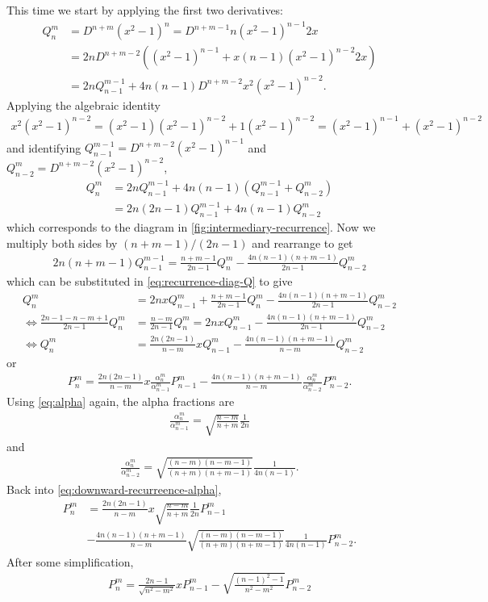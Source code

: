 \documentclass[12pt]{article}
\begin{document}
This time we start by applying the first two derivatives:
\begin{align}
  Q_n^m &= D^{n+m}(x^2-1)^n = D^{n+m-1}n(x^2-1)^{n-1}2x \\ 
        &= 2nD^{n+m-2}\left((x^2-1)^{n-1}+x(n-1)(x^2-1)^{n-2}2x\right)\\ 
        &= 2nQ_{n-1}^{m-1} + 4n(n-1)D^{n+m-2}x^2(x^2-1)^{n-2}.
\end{align}
Applying the algebraic identity 
\begin{align}
  x^2(x^2-1)^{n-2} = (x^2-1)(x^2-1)^{n-2} + 1(x^2-1)^{n-2} = (x^2-1)^{n-1} + (x^2-1)^{n-2}
\end{align}
and identifying $Q_{n-1}^{m-1}=D^{n+m-2}(x^2-1)^{n-1}$ and $Q_{n-2}^{m}=D^{n+m-2}(x^2-1)^{n-2}$,
\begin{align}
  Q_n^m &= 2nQ_{n-1}^{m-1} + 4n(n-1)\left(Q_{n-1}^{m-1} + Q_{n-2}^m\right)\\ 
        &= 2n(2n - 1)Q_{n-1}^{m-1} + 4n(n-1)Q_{n-2}^m
\end{align}
which corresponds to the diagram in \autoref{fig:intermediary-recurrence}. Now we multiply both sides by $(n+m-1)/(2n-1)$ and rearrange to get 
\begin{align}
  2n(n+m-1)Q_{n-1}^{m-1} = \frac{n+m-1}{2n-1}Q_n^m - \frac{4n(n-1)(n+m-1)}{2n-1}Q_{n-2}^m
\end{align}
which can be substituted in \eqref{eq:recurrence-diag-Q} to give 
\begin{align}
  Q_n^m &= 2nxQ_{n-1}^m + \frac{n+m-1}{2n-1}Q_n^m - \frac{4n(n-1)(n+m-1)}{2n-1}Q_{n-2}^m\\
  \iff \frac{2n-1-n-m+1}{2n-1}Q_n^m &= \frac{n-m}{2n-1}Q_n^m = 2nxQ_{n-1}^m - \frac{4n(n-1)(n+m-1)}{2n-1}Q_{n-2}^m\\ 
  \iff Q_n^m &= \frac{2n(2n-1)}{n-m}xQ_{n-1}^m - \frac{4n(n-1)(n+m-1)}{n-m}Q_{n-2}^m
\end{align}
or 
\begin{align}\label{eq:downward-recurreence-alpha}
  P_n^m = \frac{2n(2n-1)}{n-m}x\frac{\alpha_n^m}{\alpha_{n-1}^m}P_{n-1}^m - \frac{4n(n-1)(n+m-1)}{n-m}\frac{\alpha_n^m}{\alpha_{n-2}^m}P_{n-2}^m.
\end{align}
Using \eqref{eq:alpha} again, the alpha fractions are
\begin{align}
  \frac{\alpha_n^m}{\alpha_{n-1}^m} = \sqrt{\frac{n-m}{n+m}}\frac{1}{2n}
\end{align}
and 
\begin{align}
  \frac{\alpha_n^m}{\alpha_{n-2}^m} = \sqrt{\frac{(n-m)(n-m-1)}{(n+m)(n+m-1)}}\frac{1}{4n(n-1)}.
\end{align}
Back into \eqref{eq:downward-recurreence-alpha}, 
\begin{align}
  P_n^m &= \frac{2n(2n-1)}{n-m}x\sqrt{\frac{n-m}{n+m}}\frac{1}{2n}P_{n-1}^m\\ 
        &- \frac{4n(n-1)(n+m-1)}{n-m}\sqrt{\frac{(n-m)(n-m-1)}{(n+m)(n+m-1)}}\frac{1}{4n(n-1)}P_{n-2}^m. 
\end{align}
After some simplification,
\begin{align}
  \boxed{P_n^m = \frac{2n-1}{\sqrt{n^2-m^2}}xP_{n-1}^m - \sqrt{\frac{(n-1)^2 - 1}{n^2-m^2}}P_{n-2}^m}
\end{align}
\end{document}
